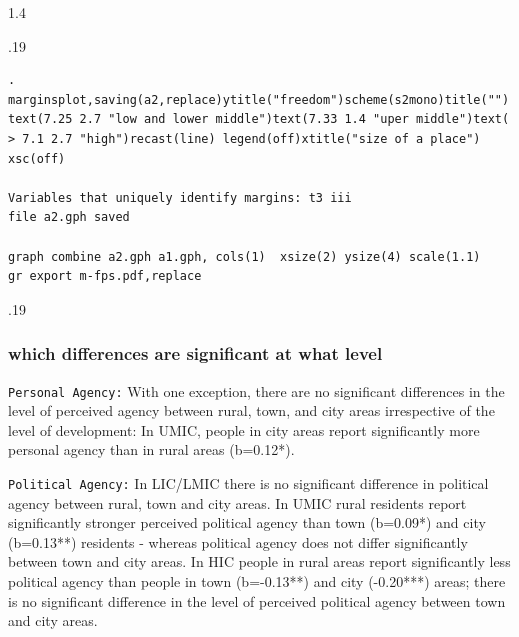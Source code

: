 \documentclass[10pt, letterpaper]{article}
\begin{document}
\begin{spacing}{1.4}
\begin{scriptsize}
\begin{spacing}{.19}
\begin{verbatim}
. marginsplot,saving(a2,replace)ytitle("freedom")scheme(s2mono)title("") text(7.25 2.7 "low and lower middle")text(7.33 1.4 "uper middle")text(
> 7.1 2.7 "high")recast(line) legend(off)xtitle("size of a place") xsc(off)

Variables that uniquely identify margins: t3 iii
file a2.gph saved

graph combine a2.gph a1.gph, cols(1)  xsize(2) ysize(4) scale(1.1)
gr export m-fps.pdf,replace
\end{verbatim}
\end{spacing}{.19}
\end{scriptsize}

\subsubsection{which differences are significant at what level}

\texttt{Personal Agency:}
With one exception, there are no significant differences in the level of
perceived agency between rural, town, and city areas irrespective of the level
of development: In UMIC, people in city areas report significantly more personal
agency than in rural areas (b=0.12*). 

\texttt{Political Agency:}
In LIC/LMIC there is no significant difference in political agency between
rural, town and city areas. In UMIC rural residents report significantly
stronger perceived political agency than town (b=0.09*) and city (b=0.13**)
residents - whereas political agency does not differ significantly between town
and city areas. In HIC people in rural areas report significantly less political agency than people in town (b=-0.13**) and city (-0.20***) areas; there is no significant difference in the level of perceived political agency between town and city areas.


\end{spacing}
\end{document}
